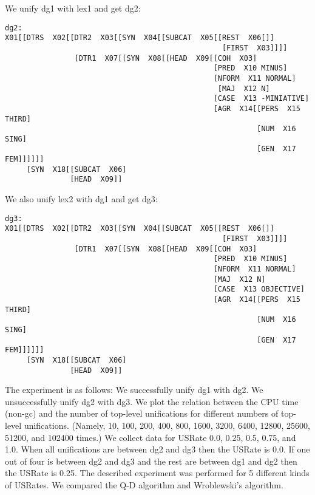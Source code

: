 We unify dg1 with lex1 and get dg2:

\begin{footnotesize}
\begin{verbatim}
dg2:
X01[[DTRS  X02[[DTR2  X03[[SYN  X04[[SUBCAT  X05[[REST  X06[]]
                                                  [FIRST  X03]]]]
                [DTR1  X07[[SYN  X08[[HEAD  X09[[COH  X03]
                                                [PRED  X10 MINUS]
                                                [NFORM  X11 NORMAL]
                                                 [MAJ  X12 N]
                                                [CASE  X13 -MINIATIVE]
                                                [AGR  X14[[PERS  X15 THIRD]
                                                          [NUM  X16 SING]
                                                          [GEN  X17 FEM]]]]]]
     [SYN  X18[[SUBCAT  X06]
               [HEAD  X09]] 
\end{verbatim}
\end{footnotesize}

We also unify lex2 with dg1 and get dg3:

\begin{footnotesize}
\begin{verbatim}
dg3:
X01[[DTRS  X02[[DTR2  X03[[SYN  X04[[SUBCAT  X05[[REST  X06[]]
                                                  [FIRST  X03]]]]
                [DTR1  X07[[SYN  X08[[HEAD  X09[[COH  X03]
                                                [PRED  X10 MINUS]
                                                [NFORM  X11 NORMAL]
                                                [MAJ  X12 N]
                                                [CASE  X13 OBJECTIVE]
                                                [AGR  X14[[PERS  X15 THIRD]
                                                          [NUM  X16 SING]
                                                          [GEN  X17 FEM]]]]]]
     [SYN  X18[[SUBCAT  X06]
               [HEAD  X09]] 
\end{verbatim}
\end{footnotesize}

The experiment is as follows:
We successfully unify dg1 with dg2. We unsuccessfully unify
dg2 with dg3. We plot the relation between the CPU time
(non-gc) and the number of top-level unifications for
different numbers of top-level unifications. (Namely, 10,
100, 200, 400, 800, 1600, 3200, 6400, 12800, 25600, 51200,
and 102400 times.) We collect data for USRate 0.0, 0.25,
0.5, 0.75, and 1.0. When all unifications are between dg2
and dg3 then the USRate is 0.0. If one out of four is
between dg2 and dg3 and the rest are between dg1 and dg2
then the USRate is 0.25. The described experiment was performed
for 5 different kinds of USRates. We compared the Q-D
algorithm and Wroblewski's algorithm. 

